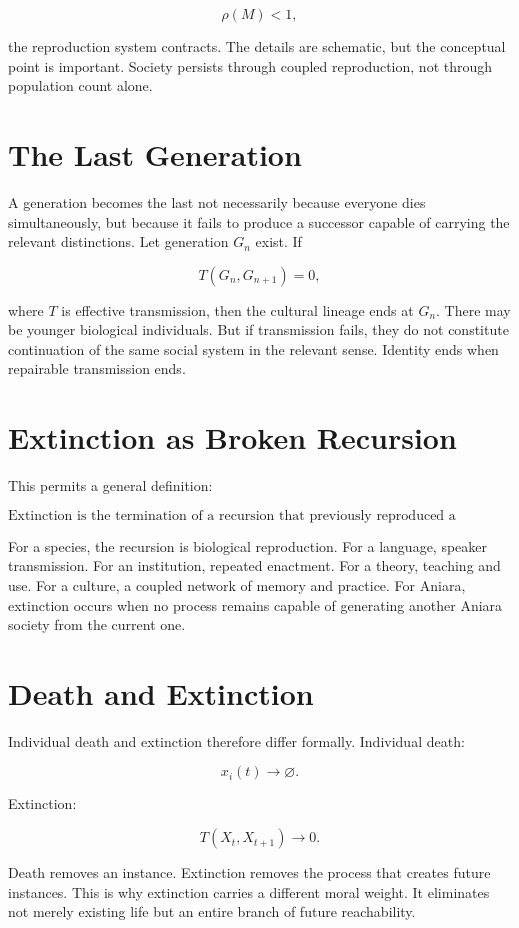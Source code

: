 \documentclass[11pt,oneside]{book}
\theoremstyle{definition}
\theoremstyle{remark}
\begin{document}
\[
\rho(M)<1,
\]

the reproduction system contracts. The details are schematic, but the conceptual point is important.
Society persists through coupled reproduction, not through population count alone.

\section{The Last Generation}

A generation becomes the last not necessarily because everyone dies simultaneously, but because it
fails to produce a successor capable of carrying the relevant distinctions. Let generation \(G_n\)
exist. If

\[
T(G_n,G_{n+1})=0,
\]

where \(T\) is effective transmission, then the cultural lineage ends at \(G_n\). There may be
younger biological individuals. But if transmission fails, they do not constitute continuation of
the same social system in the relevant sense. Identity ends when repairable transmission ends.

\section{Extinction as Broken Recursion}

This permits a general definition:

\[
\boxed{ \text{Extinction is the termination of a recursion that previously reproduced a distinction across time.} }
\]

For a species, the recursion is biological reproduction. For a language, speaker transmission. For
an institution, repeated enactment. For a theory, teaching and use. For a culture, a coupled network
of memory and practice. For Aniara, extinction occurs when no process remains capable of generating
another Aniara society from the current one.

\section{Death and Extinction}

Individual death and extinction therefore differ formally. Individual death:

\[
x_i(t)\rightarrow\varnothing.
\]

Extinction:

\[
T(X_t,X_{t+1})\rightarrow0.
\]

Death removes an instance. Extinction removes the process that creates future instances. This is why
extinction carries a different moral weight. It eliminates not merely existing life but an entire
branch of future reachability.
\end{document}
